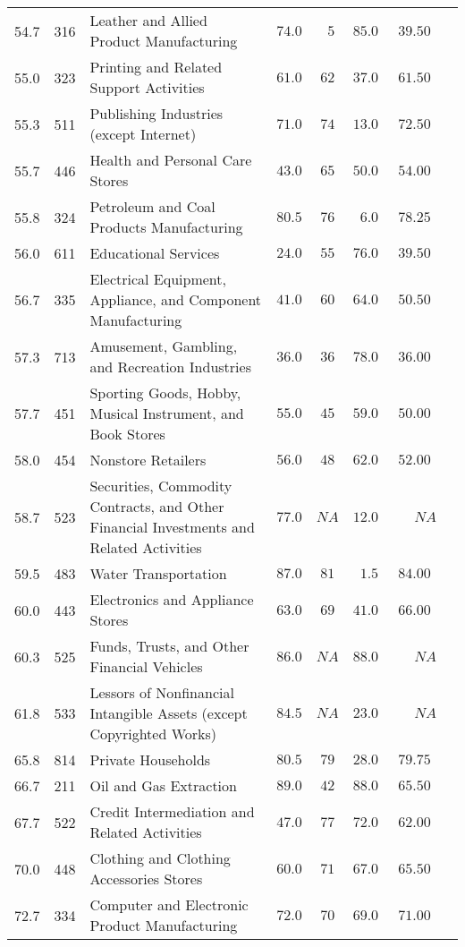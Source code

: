 \documentclass[9pt, oneside]{article}   	%
\begin{document}
\begin{longtable}{lcp{3 in}ccccc}
54.7  & 316 & Leather and Allied Product Manufacturing & $74.0$ & $\phantom{0}5$ & $85.0$ & $39.50$ \\
55.0  & 323 & Printing and Related Support Activities & $61.0$ & $62$ & $37.0$ & $61.50$ \\
55.3  & 511 & Publishing Industries (except Internet) & $71.0$ & $74$ & $13.0$ & $72.50$ \\
55.7  & 446 & Health and Personal Care Stores & $43.0$ & $65$ & $50.0$ & $54.00$ \\
55.8  & 324 & Petroleum and Coal Products Manufacturing & $80.5$ & $76$ & $\phantom{0}6.0$ & $78.25$ \\
56.0  & 611 & Educational Services & $24.0$ & $55$ & $76.0$ & $39.50$ \\
56.7  & 335 & Electrical Equipment, Appliance, and Component Manufacturing & $41.0$ & $60$ & $64.0$ & $50.50$ \\
57.3  & 713 & Amusement, Gambling, and Recreation Industries & $36.0$ & $36$ & $78.0$ & $36.00$ \\
57.7  & 451 & Sporting Goods, Hobby, Musical Instrument, and Book Stores & $55.0$ & $45$ & $59.0$ & $50.00$ \\
58.0  & 454 & Nonstore Retailers & $56.0$ & $48$ & $62.0$ & $52.00$ \\
58.7  & 523 & Securities, Commodity Contracts, and Other Financial Investments and Related Activities & $77.0$ & $NA$ & $12.0$ & $\phantom{000}NA$ \\
59.5  & 483 & Water Transportation & $87.0$ & $81$ & $\phantom{0}1.5$ & $84.00$ \\
60.0  & 443 & Electronics and Appliance Stores & $63.0$ & $69$ & $41.0$ & $66.00$ \\
60.3  & 525 & Funds, Trusts, and Other Financial Vehicles & $86.0$ & $NA$ & $88.0$ & $\phantom{000}NA$ \\
61.8  & 533 & Lessors of Nonfinancial Intangible Assets (except Copyrighted Works) & $84.5$ & $NA$ & $23.0$ & $\phantom{000}NA$ \\
65.8  & 814 & Private Households & $80.5$ & $79$ & $28.0$ & $79.75$ \\
66.7  & 211 & Oil and Gas Extraction & $89.0$ & $42$ & $88.0$ & $65.50$ \\
67.7  & 522 & Credit Intermediation and Related Activities & $47.0$ & $77$ & $72.0$ & $62.00$ \\
70.0  & 448 & Clothing and Clothing Accessories Stores & $60.0$ & $71$ & $67.0$ & $65.50$ \\
72.7  & 334 & Computer and Electronic Product Manufacturing & $72.0$ & $70$ & $69.0$ & $71.00$ \\

\end{longtable}
\end{document}
